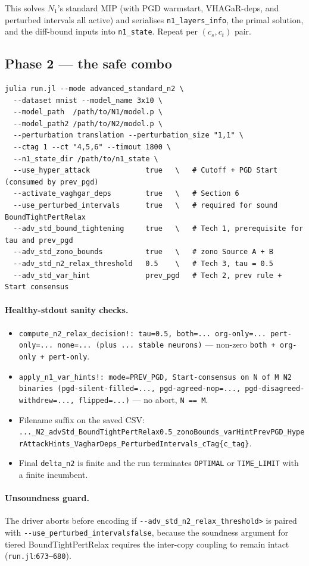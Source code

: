 \documentclass[11pt]{article}
\newcommand{\src}[1]{\texttt{\small #1}}
\newcommand{\flag}[1]{\texttt{-{}-#1}}
\newcommand{\fileline}[2]{\src{#1}:\src{#2}}
\begin{document}
This solves $N_1$'s standard MIP (with PGD warmstart, VHAGaR-deps,
and perturbed intervals all active) and serialises
\src{n1\_layers\_info}, the primal solution, and the diff-bound
inputs into \src{n1\_state}. Repeat per $(c_s, c_t)$ pair.

\subsection{Phase 2 --- the safe combo}

\begin{lstlisting}[basicstyle=\ttfamily\small,breaklines=true,frame=single]
julia run.jl --mode advanced_standard_n2 \
  --dataset mnist --model_name 3x10 \
  --model_path  /path/to/N1/model.p \
  --model_path2 /path/to/N2/model.p \
  --perturbation translation --perturbation_size "1,1" \
  --ctag 1 --ct "4,5,6" --timout 1800 \
  --n1_state_dir /path/to/n1_state \
  --use_hyper_attack             true   \   # Cutoff + PGD Start (consumed by prev_pgd)
  --activate_vaghgar_deps        true   \   # Section 6
  --use_perturbed_intervals      true   \   # required for sound BoundTightPertRelax
  --adv_std_bound_tightening     true   \   # Tech 1, prerequisite for tau and prev_pgd
  --adv_std_zono_bounds          true   \   # zono Source A + B
  --adv_std_n2_relax_threshold   0.5    \   # Tech 3, tau = 0.5
  --adv_std_var_hint             prev_pgd   # Tech 2, prev rule + Start consensus
\end{lstlisting}

\paragraph{Healthy-stdout sanity checks.}
\begin{itemize}[noitemsep, leftmargin=2em]
  \item \src{compute\_n2\_relax\_decision!: tau=0.5, both=...
    org-only=... pert-only=... none=... (plus ... stable neurons)}
    --- non-zero \src{both + org-only + pert-only}.
  \item \src{apply\_n1\_var\_hints!: mode=PREV\_PGD, Start-consensus
    on N of M N2 binaries (pgd-silent-filled=...,
    pgd-agreed-nop=..., pgd-disagreed-withdrew=..., flipped=...)}
    --- no abort, \src{N == M}.
  \item Filename suffix on the saved CSV:
    \src{...\_N2\_advStd\_BoundTightPertRelax0.5\_zonoBounds\_varHintPrevPGD\_HyperAttackHints\_VagharDeps\_PerturbedIntervals\_cTag\{c\_tag\}}.
  \item Final \src{delta\_n2} is finite and the run terminates
    \src{OPTIMAL} or \src{TIME\_LIMIT} with a finite incumbent.
\end{itemize}

\paragraph{Unsoundness guard.}
The driver aborts before encoding if
\flag{adv\_std\_n2\_relax\_threshold}\;\texttt{>}\;0 is paired with
\flag{use\_perturbed\_intervals}\;\texttt{false}, because the
soundness argument for tiered BoundTightPertRelax requires the
inter-copy coupling to remain intact (\fileline{run.jl}{673--680}).
\end{document}
